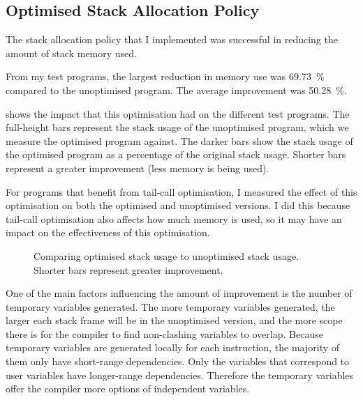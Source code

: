 \documentclass[00-main.tex]{subfiles}
\begin{document}
\subsection{Optimised Stack Allocation Policy}

The stack allocation policy that I implemented was successful in reducing the amount of stack memory used.

From my test programs, the largest reduction in memory use was \SI{69.73}{\percent} compared to the unoptimised program.
The average improvement was \SI{50.28}{\percent}.

 shows the impact that this optimisation had on the different test programs.
The full-height bars represent the stack usage of the unoptimised program, which we measure the optimised program against.
The darker bars show the stack usage of the optimised program as a percentage of the original stack usage.
Shorter bars represent a greater improvement (less memory is being used).

For programs that benefit from tail-call optimisation, I measured the effect of this optimisation on both the optimised and unoptimised versions.
I did this because tail-call optimisation also affects how much memory is used, so it may have an impact on the effectiveness of this optimisation.

\begin{figure}[t]
  \centering
  \caption{Comparing optimised stack usage to unoptimised stack usage. Shorter bars represent greater improvement.}
  \label{fig:comparing stack usage optimisation across programs} %
\end{figure}

One of the main factors influencing the amount of improvement is the number of temporary variables generated.
The more temporary variables generated, the larger each stack frame will be in the unoptimised version, and the more scope there is for the compiler to find non-clashing variables to overlap.
Because temporary variables are generated locally for each instruction, the majority of them only have short-range dependencies.
Only the variables that correspond to user variables have longer-range dependencies.
Therefore the temporary variables offer the compiler more options of independent variables.
\end{document}

